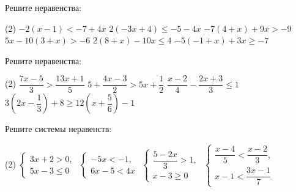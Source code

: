 \begin{consultation}
	\begin{listofex}
		\item Решите неравенства:
		\begin{tasks}(2)
			\task \( -2(x-1)<-7+4x \)
			\task \( 2(-3x+4)\le-5-4x \)
			\task \( -7(4+x)+9x>-9 \)
			\task \( 5x-10(3+x)>-6 \)
			\task \( 2(8+x)-10x\le4 \)
			\task \( -5(-1+x)+3x\ge-7 \)
		\end{tasks}
		\item Решите неравенства:
		\begin{tasks}(2)
			\task \( \dfrac{7x-5}{3}>\dfrac{13x+1}{5} \)
			\task \( 5+\dfrac{4x-3}{2}>5x+\dfrac{1}{2} \)
			\task \( \dfrac{x-2}{4}-\dfrac{2x+3}{3}\le1 \)
			\task \( 3(2x-\dfrac{1}{3})+8\ge12(x+\dfrac{5}{6})-1 \)
		\end{tasks}
		\item Решите системы неравенств:
		\begin{tasks}(2)
			\task \( \left\{
			\begin{array}{l}
				3x+2>0,\\
				5x-3\le0
			\end{array}
			\right. \)
			\task \( \left\{
			\begin{array}{l}
				-5x<-1,\\
				6x-5<4x
			\end{array}
			\right. \)
			\task \( \left\{
			\begin{array}{l}
				\dfrac{5-2x}{3}>1,\\
				x-3\ge0
			\end{array}
			\right. \)
			\task \( \left\{
			\begin{array}{l}
				\dfrac{x-4}{5}<\dfrac{x-2}{3},\\
				x-1<\dfrac{3x-1}{7}
			\end{array}
			\right. \)
		\end{tasks}
	\end{listofex}
\end{consultation}
